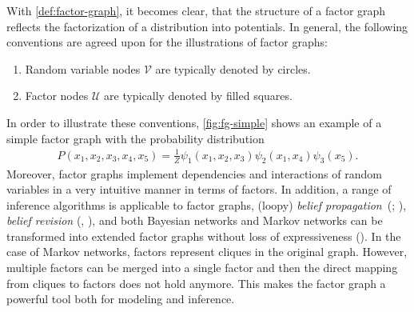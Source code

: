 With \cref{def:factor-graph}, it becomes clear, that the structure of a factor graph reflects the
factorization of a distribution into potentials. In general, the following conventions are agreed
upon for the illustrations of factor graphs:
\begin{enumerate}
      \item Random variable nodes $\mathcal{V}$ are typically denoted by circles.
      \item Factor nodes $\mathcal{U}$ are typically denoted by filled squares.
\end{enumerate}
In order to illustrate these conventions, \cref{fig:fg-simple} shows an example of a simple factor
graph with the probability distribution
\begin{align}
    \label{eq:fg-simple}
    P(x_1,x_2,x_3,x_4,x_5) = \frac{1}{Z}\psi_1(x_1,x_2,x_3)\psi_2(x_1,x_4)\psi_3(x_5).
\end{align}
Moreover, factor graphs implement dependencies and interactions of random variables in a very
intuitive manner in terms of factors. In addition, a range of inference algorithms is applicable to
factor graphs, \eg (loopy) \emph{belief propagation}~(\citealp{pearl_82_reverend};
\citealp[Chapter~5.1.3,Chapter~28.7]{barber_12_bayesian}), \emph{belief revision}
(\citealp{darwiche_96_logic}, \citealp[Chapter~5.2.1]{barber_12_bayesian}), and both
Bayesian networks and Markov networks can be transformed into extended factor graphs without loss of
expressiveness (\citealp[Section~2]{frey_03_extending}). In the case of Markov networks, factors
represent cliques in the original graph. However, multiple factors can be merged into a single
factor and then the direct mapping from cliques to factors does not hold anymore. This makes the
factor graph a powerful tool both for modeling and inference.

